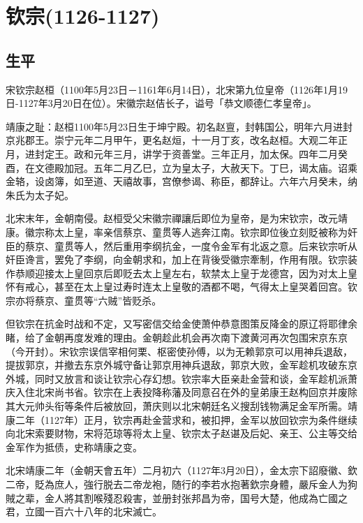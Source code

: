 
\section{钦宗\tiny(1126-1127)}

\subsection{生平}

宋钦宗赵桓（1100年5月23日－1161年6月14日），北宋第九位皇帝（1126年1月19日-1127年3月20日在位）。宋徽宗赵佶长子，谥号「恭文顺德仁孝皇帝」。

靖康之耻：赵桓1100年5月23日生于坤宁殿。初名赵亶，封韩国公，明年六月进封京兆郡王。崇宁元年二月甲午，更名赵烜，十一月丁亥，改名赵桓。大观二年正月，进封定王。政和元年三月，讲学于资善堂。三年正月，加太保。四年二月癸酉，在文德殿加冠。五年二月乙巳，立为皇太子，大赦天下。丁巳，谒太庙。诏乘金辂，设卤簿，如至道、天禧故事，宫僚参谒、称臣，都辞让。六年六月癸未，纳朱氏为太子妃。

北宋末年，金朝南侵。赵桓受父宋徽宗禪讓后即位为皇帝，是为宋钦宗，改元靖康。徽宗称太上皇，率亲信蔡京、童贯等人逃奔江南。钦宗即位後立刻貶被称为奸臣的蔡京、童贯等人，然后重用李纲抗金，一度令金军有北返之意。后来钦宗听从奸臣谗言，罢免了李纲，向金朝求和，加上在背後受徽宗牽制，作用有限。钦宗装作恭顺迎接太上皇回京后即贬去太上皇左右，软禁太上皇于龙德宫，因为对太上皇怀有戒心，甚至在太上皇过寿时连太上皇敬的酒都不喝，气得太上皇哭着回宫。钦宗亦将蔡京、童贯等“六贼”皆贬杀。

但钦宗在抗金时战和不定，又写密信交给金使萧仲恭意图策反降金的原辽将耶律余睹，给了金朝再度发难的理由。金朝趁此机会再次南下渡黄河再次包围宋京东京（今开封）。宋钦宗误信宰相何栗、枢密使孙傅，以为无赖郭京可以用神兵退敌，提拔郭京，并撤去东京外城守备让郭京用神兵退敌，郭京大败，金军趁机攻破东京外城，同时又放言和谈让钦宗心存幻想。钦宗率大臣亲赴金营和谈，金军趁机派萧庆入住北宋尚书省。钦宗在上表投降称藩及同意召在外的皇弟康王赵构回京并废除其大元帅头衔等条件后被放回，萧庆则以北宋朝廷名义搜刮钱物满足金军所需。靖康二年（1127年）正月，钦宗再赴金营求和，被扣押，金军以放回钦宗为条件继续向北宋索要财物，宋将范琼等将太上皇、钦宗太子赵谌及后妃、亲王、公主等交给金军作为抵债，史称靖康之变。

北宋靖康二年（金朝天會五年）二月初六（1127年3月20日），金太宗下詔廢徽、欽二帝，貶為庶人，強行脱去二帝龙袍，随行的李若水抱著欽宗身體，嚴斥金人为狗賊之辈，金人將其割喉殘忍殺害，並册封张邦昌为帝，国号大楚，他成為亡國之君，立國一百六十八年的北宋滅亡。

